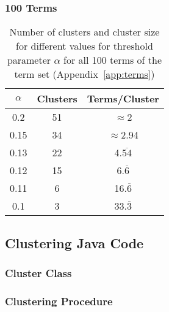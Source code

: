 \subsubsection{100 Terms}
\label{app:alpha_100terms}
\begin{table}[h]
    \centering
    \begin{tabular}{|c|c|c|}
        \hline
        $\alpha$ & Clusters & Terms/Cluster  \\
        \hline
        0.2 & 51 & $\approx$2 \\
        0.15 & 34 & $\approx$2.94 \\
        0.13 & 22 & 4.$\overline{54}$ \\
        0.12 & 15 & 6.$\overline{6}$ \\
        0.11 & 6 & 16.$\overline{6}$ \\
        0.1 & 3 & 33.$\overline{3}$ \\
        \hline
    \end{tabular}
    \caption{Number of clusters and cluster size for different values for threshold parameter $\alpha$ for all 100 terms of the term set
            (Appendix~\ref{app:terms})}
    \label{tab:app_100terms}
\end{table}

\newpage
\subsection{Clustering Java Code}
\label{app:java}

\subsubsection{Cluster Class}
\label{app:java_cluster}



\subsubsection{Clustering Procedure}
\label{app:java_clustering}


